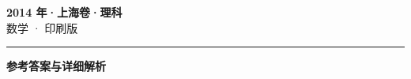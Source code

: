 \documentclass[zihao=5, a4paper]{ctexart}
\begin{document}
\begin{center}
  {\Large\bfseries 2014 年·上海卷·理科}\\[4pt]
  {\large 数学 · 印刷版}
\end{center}
\medskip
{}

\par\bigskip\hrule\bigskip
{}
\Needspace{0.55\textheight}
\begin{center}{\large\bfseries 参考答案与详细解析}\end{center}
\smallskip

\end{document}
